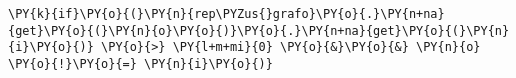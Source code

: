 \begin{Verbatim}[commandchars=\\\{\}]
 \PY{k}{if}\PY{o}{(}\PY{n}{rep\PYZus{}grafo}\PY{o}{.}\PY{n+na}{get}\PY{o}{(}\PY{n}{o}\PY{o}{)}\PY{o}{.}\PY{n+na}{get}\PY{o}{(}\PY{n}{i}\PY{o}{)} \PY{o}{>} \PY{l+m+mi}{0} \PY{o}{&}\PY{o}{&} \PY{n}{o} \PY{o}{!}\PY{o}{=} \PY{n}{i}\PY{o}{)}	
\end{Verbatim}
